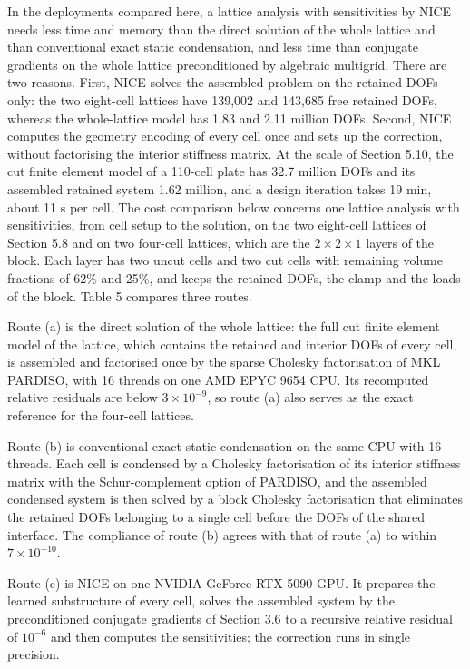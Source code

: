 \documentclass[preprint,12pt,authoryear]{elsarticle}
\begin{document}
In the deployments compared here, a lattice analysis with sensitivities by NICE needs less time and memory than the direct solution of the whole lattice and than conventional exact static condensation, and less time than conjugate gradients on the whole lattice preconditioned by algebraic multigrid. There are two reasons. First, NICE solves the assembled problem on the retained DOFs only: the two eight-cell lattices have 139,002 and 143,685 free retained DOFs, whereas the whole-lattice model has 1.83 and 2.11 million DOFs. Second, NICE computes the geometry encoding of every cell once and sets up the correction, without factorising the interior stiffness matrix. At the scale of Section 5.10, the cut finite element model of a 110-cell plate has 32.7 million DOFs and its assembled retained system 1.62 million, and a design iteration takes 19 min, about 11 s per cell. The cost comparison below concerns one lattice analysis with sensitivities, from cell setup to the solution, on the two eight-cell lattices of Section 5.8 and on two four-cell lattices, which are the \(2\times2\times1\) layers of the block. Each layer has two uncut cells and two cut cells with remaining volume fractions of 62\% and 25\%, and keeps the retained DOFs, the clamp and the loads of the block. Table 5 compares three routes.

Route (a) is the direct solution of the whole lattice: the full cut finite element model of the lattice, which contains the retained and interior DOFs of every cell, is assembled and factorised once by the sparse Cholesky factorisation of MKL PARDISO, with 16 threads on one AMD EPYC 9654 CPU. Its recomputed relative residuals are below \(3\times10^{-9}\), so route (a) also serves as the exact reference for the four-cell lattices.

Route (b) is conventional exact static condensation on the same CPU with 16 threads. Each cell is condensed by a Cholesky factorisation of its interior stiffness matrix with the Schur-complement option of PARDISO, and the assembled condensed system is then solved by a block Cholesky factorisation that eliminates the retained DOFs belonging to a single cell before the DOFs of the shared interface. The compliance of route (b) agrees with that of route (a) to within \(7\times10^{-10}\).

Route (c) is NICE on one NVIDIA GeForce RTX 5090 GPU. It prepares the learned substructure of every cell, solves the assembled system by the preconditioned conjugate gradients of Section 3.6 to a recursive relative residual of \(10^{-6}\) and then computes the sensitivities; the correction runs in single precision.
\end{document}
